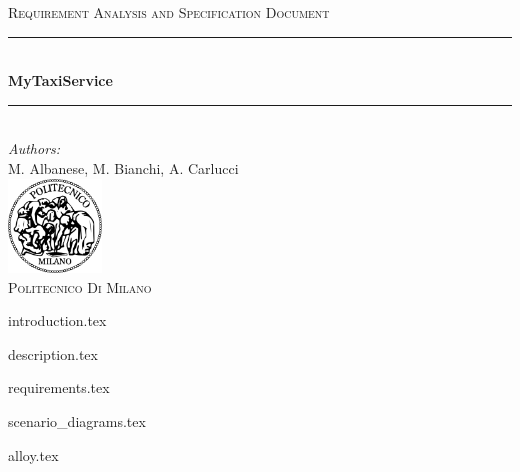 \documentclass[a4paper,12pt]{article}
\begin{document}
\begin{titlepage}
\begin{center}
\textsc{\LARGE Requirement Analysis and Specification Document}\\[1.5cm] %

\rule{\linewidth}{0.5mm} \\[0.7cm]
{\huge \bfseries MyTaxiService}\\[0.4cm] %
\rule{\linewidth}{0.5mm} \\[1.5cm]
 
\emph{Authors:}\\
M. Albanese, M. Bianchi, A. Carlucci\\[2.0cm] 

\vfill
\vfill
\includegraphics[width=25mm]{polimi.png}\\
\textsc{Politecnico Di Milano}
\end{center}
\end{titlepage}

\tableofcontents
\pagebreak

{introduction.tex}

{description.tex}

{requirements.tex}

{scenario_diagrams.tex}

{alloy.tex}


\end{document}
